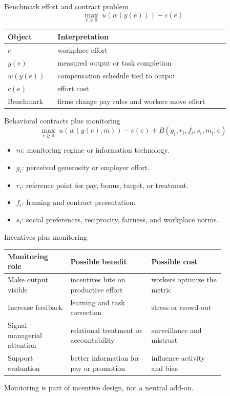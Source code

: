 \documentclass[aspectratio=169,11pt]{beamer}
\begin{document}
\begin{frame}{Benchmark effort and contract problem}
\[
\max_{e \ge 0} \; u\!\left(w(y(e))\right) - c(e)
\]

\small
\begin{tabular}{p{0.18\linewidth} p{0.68\linewidth}}
\toprule
Object & Interpretation \\
\midrule
$e$ & workplace effort \\
$y(e)$ & measured output or task completion \\
$w(y(e))$ & compensation schedule tied to output \\
$c(e)$ & effort cost \\
Benchmark & firms change pay rules and workers move effort \\
\bottomrule
\end{tabular}
\end{frame}

\begin{frame}{Behavioral contracts plus monitoring}
\[
\max_{e \ge 0} \; u\!\left(w(y(e),m)\right) - c(e)
 + B\!\left(g_i, r_i, f_i, s_i, m_i; e\right)
\]

\begin{itemize}
    \item $m$: monitoring regime or information technology.
    \item $g_i$: perceived generosity or employer effort.
    \item $r_i$: reference point for pay, bonus, target, or treatment.
    \item $f_i$: framing and contract presentation.
    \item $s_i$: social preferences, reciprocity, fairness, and workplace norms.
\end{itemize}
\end{frame}

\begin{frame}{Incentives plus monitoring}
\small
\begin{tabular}{p{0.24\linewidth} p{0.31\linewidth} p{0.29\linewidth}}
\toprule
Monitoring role & Possible benefit & Possible cost \\
\midrule
Make output visible & incentives bite on productive effort & workers optimize the metric \\
Increase feedback & learning and task correction & stress or crowd-out \\
Signal managerial attention & relational treatment or accountability & surveillance and mistrust \\
Support evaluation & better information for pay or promotion & influence activity and bias \\
\bottomrule
\end{tabular}

\vspace{0.7em}
Monitoring is part of incentive design, not a neutral add-on.
\end{frame}
\end{document}
